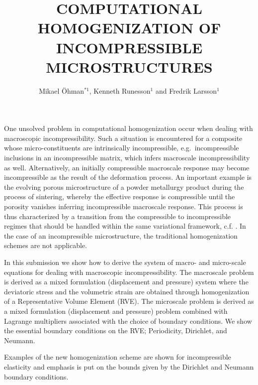 \documentclass{Eccomas}
\title{COMPUTATIONAL HOMOGENIZATION OF INCOMPRESSIBLE MICROSTRUCTURES}
\author{Mikael \"Ohman$^{*1}$, Kenneth Runesson$^{1}$ and Fredrik Larsson$^{1}$}
\begin{document}
One unsolved problem in computational homogenization occur when dealing with macroscopic incompressibility.
Such a situation is encountered for a composite whose micro-constituents are intrinsically incompressible, e.g.\ incompressible inclusions in an incompressible matrix, which infers macroscale incompressibility as well.
Alternatively, an initially compressible macroscale response may become incompressible as the result of the deformation process.
An important example is the evolving porous microstructure of a powder metallurgy product during the process of sintering, whereby the effective response is compressible until the porosity vanishes inferring incompressible macroscale response.
This process is thus characterized by a transition from the compressible to incompressible regimes that should be handled within the same variational framework, c.f. \cite{Ohman2013}.
In the case of an incompressible microstructure, the traditional homogenization schemes are not applicable.

In this submission we show how to derive the system of macro- and micro-scale equations for dealing with macroscopic incompressibility.
The macroscale problem is derived as a mixed formulation (displacement and pressure) system where the deviatoric stress and the volumetric strain are obtained through homogenization of a Representative Volume Element (RVE). The microscale problem is derived as a mixed formulation (displacement and pressure) problem combined with Lagrange multipliers associated with the choice of boundary conditions. We show the essential boundary conditions on the RVE; Periodicity, Dirichlet, and Neumann.

Examples of the new homogenization scheme are shown for incompressible elasticity and emphasis is put on the bounds given by the Dirichlet and Neumann boundary conditions.
\end{document}
